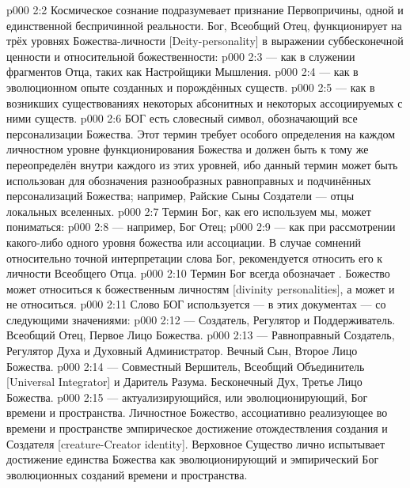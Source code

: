 \vs p000 2:2 Космическое сознание подразумевает признание Первопричины, одной и единственной беспричинной реальности. Бог, Всеобщий Отец, функционирует на трёх уровнях Божества\hyp{}личности [Deity\hyp{}personality] в выражении суббесконечной ценности и относительной божественности:
\vs p000 2:3 \bibnobreakspace {} --- как в служении фрагментов Отца, таких как Настройщики Мышления.
\vs p000 2:4 \bibnobreakspace {} --- как в эволюционном опыте созданных и порождённых существ.
\vs p000 2:5 \bibnobreakspace {} --- как в возникших существованиях некоторых абсонитных и некоторых ассоциируемых с ними существ.
\vs p000 2:6 БОГ есть словесный символ, обозначающий все персонализации Божества. Этот термин требует особого определения на каждом личностном уровне функционирования Божества и должен быть к тому же переопределён внутри каждого из этих уровней, ибо данный термин может быть использован для обозначения разнообразных равноправных и подчинённых персонализаций Божества; например, Райские Сыны Создатели --- отцы локальных вселенных.
\vs p000 2:7 \pc Термин Бог, как его используем мы, может пониматься:
\vs p000 2:8  --- например, Бог Отец;
\vs p000 2:9  --- как при рассмотрении какого\hyp{}либо одного уровня божества или ассоциации. В случае сомнений относительно точной интерпретации слова Бог, рекомендуется относить его к личности Всеобщего Отца.
\vs p000 2:10 \pc Термин Бог всегда обозначает . Божество может относиться к божественным личностям [divinity personalities], а может и не относиться.
\vs p000 2:11 \pc Слово БОГ используется --- в этих документах --- со следующими значениями:
\vs p000 2:12 \bibnobreakspace {} --- Создатель, Регулятор и Поддерживатель. Всеобщий Отец, Первое Лицо Божества.
\vs p000 2:13 \bibnobreakspace {} --- Равноправный Создатель, Регулятор Духа и Духовный Администратор. Вечный Сын, Второе Лицо Божества.
\vs p000 2:14 \bibnobreakspace {} --- Совместный Вершитель, Всеобщий Объединитель [Universal Integrator] и Даритель Разума. Бесконечный Дух, Третье Лицо Божества.
\vs p000 2:15 \bibnobreakspace {} --- актуализирующийся, или эволюционирующий, Бог времени и пространства. Личностное Божество, ассоциативно реализующее во времени и пространстве эмпирическое достижение отождествления создания и Создателя [creature\hyp{}Creator identity]. Верховное Существо лично испытывает достижение единства Божества как эволюционирующий и эмпирический Бог эволюционных созданий времени и пространства.
